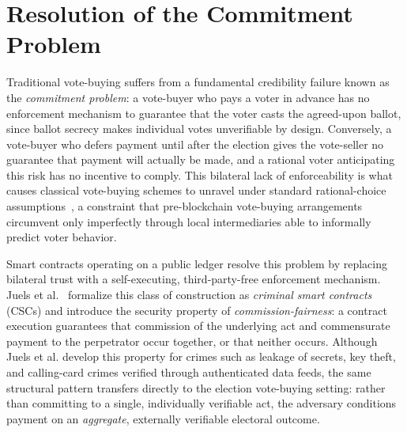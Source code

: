\documentclass[journal,onecolumn,11pt]{IEEEtran}
\begin{document}
\section{Resolution of the Commitment Problem}
\label{sec:commitment-problem}
Traditional vote-buying suffers from a fundamental credibility failure known as the
\emph{commitment problem}: a vote-buyer who pays a voter in advance has no
enforcement mechanism to guarantee that the voter casts the agreed-upon ballot, since
ballot secrecy makes individual votes unverifiable by design. Conversely, a vote-buyer
who defers payment until after the election gives the vote-seller no guarantee that payment
will actually be made, and a rational voter anticipating this risk has no incentive to
comply. This bilateral lack of enforceability is what causes classical vote-buying
schemes to unravel under standard rational-choice assumptions~\cite{finan2011votebuying}, a constraint that pre-blockchain vote-buying
arrangements circumvent only imperfectly through local intermediaries able to informally
predict voter behavior.

Smart contracts operating on a public ledger resolve this problem by replacing
bilateral trust with a self-executing, third-party-free enforcement mechanism.
Juels et al.~\cite{juels2016ring} formalize this class of construction as
\emph{criminal smart contracts} (CSCs) and introduce the security property of
\emph{commission-fairness}: a contract execution guarantees that commission of the
underlying act and commensurate payment to the perpetrator occur together, or that
neither occurs. Although Juels et al. develop this property for crimes such as
leakage of secrets, key theft, and calling-card crimes verified through authenticated
data feeds, the same structural pattern transfers directly to the election
vote-buying setting: rather than committing to a single, individually verifiable act,
the adversary conditions payment on an \emph{aggregate}, externally verifiable
electoral outcome.
\end{document}
